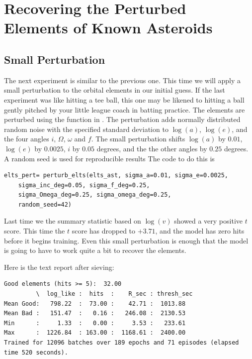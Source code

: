 \section{Recovering the Perturbed Elements of Known Asteroids}
\label{section_results_known_ast_perturbed}

\subsection{Small Perturbation}
The next experiment is similar to the previous one.
This time we will apply a small perturbation to the orbital elements in our initial guess.
If the last experiment was like hitting a tee ball, this one may be likened to hitting a ball gently pitched by your little league coach in batting practice.
The elements are perturbed using the function  in .
The perturbation adds normally distributed random noise with the specified standard deviation
to $\log(a)$, $\log(e)$, and the four angles $i$, $\Omega$, $\omega$ and $f$.
The small perturbation shifts $\log(a)$ by $0.01$, $\log(e)$ by $0.0025$, $i$ by $0.05$ degrees,
and the the other angles by $0.25$ degrees.
A random seed is used for reproducible results
The code to do this is
\begin{lstlisting}[style=CodeSnippet]
elts_pert= perturb_elts(elts_ast, sigma_a=0.01, sigma_e=0.0025, 
	sigma_inc_deg=0.05, sigma_f_deg=0.25, 
	sigma_Omega_deg=0.25, sigma_omega_deg=0.25,
	random_seed=42)
\end{lstlisting}
Last time we the summary statistic based on $\log(v)$ showed a very positive $t$ score.
This time the $t$ score has dropped to $+3.71$, and the model has zero hits before it begins training.
Even this small perturbation is enough that the model is going to have to work quite a bit to recover the elements.

Here is the text report after sieving:
\begin{lstlisting}[style=CodeSnippet]
Good elements (hits >= 5):  32.00
         \  log_like :  hits  :    R_sec : thresh_sec
Mean Good:   798.22  :  73.00 :    42.71 :  1013.88
Mean Bad :   151.47  :   0.16 :   246.08 :  2130.53
Min      :     1.33  :   0.00 :     3.53 :   233.61
Max      :  1226.84  : 163.00 :  1168.61 :  2400.00
Trained for 12096 batches over 189 epochs and 71 episodes (elapsed time 520 seconds).
\end{lstlisting}


